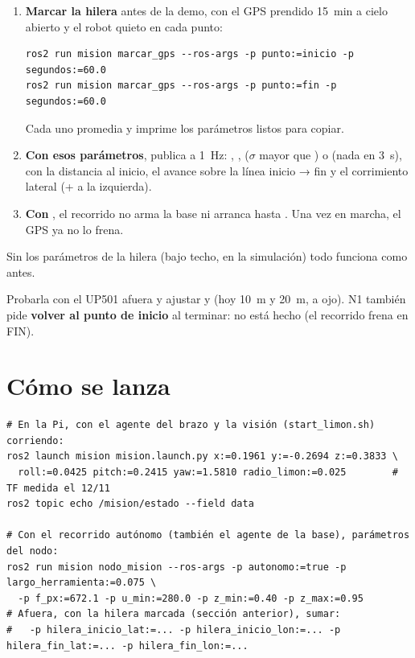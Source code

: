 \begin{enumerate}
  \item \textbf{Marcar la hilera} antes de la demo, con el GPS prendido 15~min a cielo abierto y el robot quieto en
        cada punto:
\begin{lstlisting}[language=consola]
ros2 run mision marcar_gps --ros-args -p punto:=inicio -p segundos:=60.0
ros2 run mision marcar_gps --ros-args -p punto:=fin -p segundos:=60.0
\end{lstlisting}
        Cada uno promedia  y imprime los parámetros  listos para copiar.
  \item \textbf{Con esos parámetros},  publica  a 1~Hz: ,
        ,  ($\sigma$ mayor que ) o  (nada en 3~s), con la
        distancia al inicio, el avance sobre la línea inicio → fin y el corrimiento lateral (+ a la izquierda).
  \item \textbf{Con }, el recorrido no arma la base ni arranca hasta . Una vez
        en marcha, el GPS ya no lo frena.
\end{enumerate}

Sin los parámetros de la hilera (bajo techo, en la simulación) todo funciona como antes.

\begin{pendiente}
Probarla con el UP501 afuera y ajustar  y  (hoy 10~m y 20~m, a
ojo). N1 también pide \textbf{volver al punto de inicio} al terminar: no está hecho (el recorrido frena en FIN).
\end{pendiente}

\section{Cómo se lanza}

\begin{lstlisting}[language=consola]
# En la Pi, con el agente del brazo y la visión (start_limon.sh) corriendo:
ros2 launch mision mision.launch.py x:=0.1961 y:=-0.2694 z:=0.3833 \
  roll:=0.0425 pitch:=0.2415 yaw:=1.5810 radio_limon:=0.025        # TF medida el 12/11
ros2 topic echo /mision/estado --field data

# Con el recorrido autónomo (también el agente de la base), parámetros del nodo:
ros2 run mision nodo_mision --ros-args -p autonomo:=true -p largo_herramienta:=0.075 \
  -p f_px:=672.1 -p u_min:=280.0 -p z_min:=0.40 -p z_max:=0.95
# Afuera, con la hilera marcada (sección anterior), sumar:
#   -p hilera_inicio_lat:=... -p hilera_inicio_lon:=... -p hilera_fin_lat:=... -p hilera_fin_lon:=...
\end{lstlisting}

